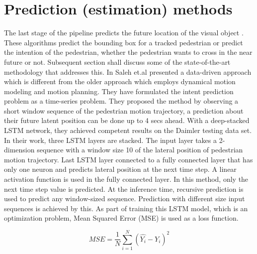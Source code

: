\section{Prediction (estimation) methods }
The last stage of the pipeline predicts the future location of the visual object \cite{saleh2017intent, zhang2019sr, xue2018ss, lipton2015critical}. These algorithms predict the bounding box for a tracked pedestrian or predict the intention of the pedestrian, whether the pedestrian wants to cross in the near future or not. Subsequent section shall discuss some of the state-of-the-art methodology that addresses this.
In \cite{saleh2017intent} Saleh et.al presented a data-driven approach which is different from the older approach which employs dynamical motion modeling and motion planning. They have formulated the intent prediction problem as a time-series problem. They proposed the method by observing a short window sequence of the pedestrian motion trajectory, a prediction about their future latent position can be done up to 4 secs ahead. With a deep-stacked LSTM network, they achieved competent results on the Daimler testing data set. In their work, three LSTM layers are stacked. The input layer takes a 2-dimension sequence with a window size 10 of the lateral position of pedestrian motion trajectory. Last LSTM layer connected to a fully connected layer that has only one neuron and predicts lateral position at the next time step. A linear activation function is used in the fully connected layer. In this method, only the next time step value is predicted. At the inference time, recursive prediction is used to predict any window-sized sequence. Prediction with different size input sequences is achieved by this.
As part of training this LSTM  model, which is an optimization problem, Mean Squared Error (MSE) is used as a loss function.

\begin{equation}
MSE= \frac{1}{N}\sum_{i=1}^{N}(\hat{Y_i} - Y_i)^2
\end{equation}

